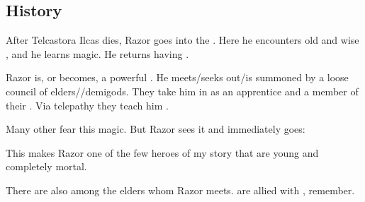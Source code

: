 \subsection{History}
After Telcastora Ilcas dies, Razor goes into the \Wylde{}. 
Here he encounters old and wise \nycans, and he learns magic. 
He returns having . 

Razor is, or becomes, a powerful \vertex. 
He meets/seeks out/is summoned by a loose council of \nycan{} elders/\vertices/demigods. 
They take him in as an apprentice and a member of their \matrixx. 
Via telepathy they teach him . 

Many other \nycans{} fear this magic. 
But Razor sees it and immediately goes: 

This makes Razor one of the few heroes of my story that are young and completely mortal. 

There are also \cuezcans{} among the elders whom Razor meets. 
\Cuezcans{} are allied with \nycans, remember. 















